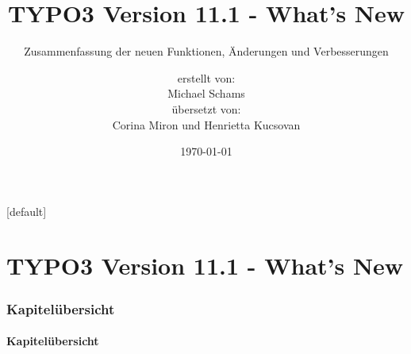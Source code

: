 \documentclass[t]{beamer}
\title{TYPO3 Version 11.1 - What's New}
\subtitle{Zusammenfassung der neuen Funktionen, Änderungen und Verbesserungen}
\author{
	\centerline{erstellt von:}
	\centerline{Michael Schams}
	\centerline{übersetzt von:}
	\centerline{Corina Miron und Henrietta Kucsovan}
}
\date{\today}
\begin{document}
\sharefont


\begingroup
	[default]
	\begin{frame}
		\titlepage
	\end{frame}
\endgroup


\section*{TYPO3 Version 11.1 - What's New}
\begin{frame}[fragile]
	\frametitle{Kapitelübersicht}
	\framesubtitle{Kapitelübersicht}

	\tableofcontents

\end{frame}

















\end{document}
